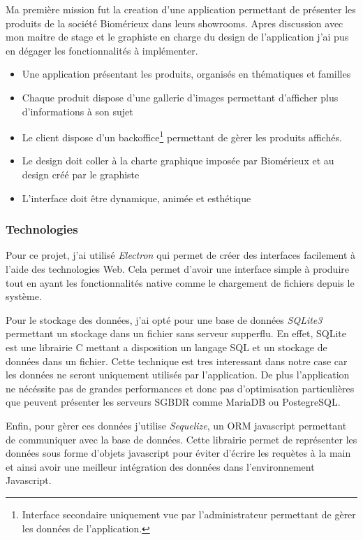 \documentclass{article}
\begin{document}
Ma première mission fut la creation d'une application permettant de présenter les produits de la société Biomérieux dans leurs showrooms.
Apres discussion avec mon maitre de stage et le graphiste en charge du design de l'application j'ai pus en dégager les fonctionnalités à implémenter.

\medskip

\begin{itemize}
    \item Une application présentant les produits, organisés en thématiques et familles
    \item Chaque produit dispose d'une gallerie d'images permettant d'afficher plus d'informations à son sujet
    \item Le client dispose d'un backoffice\footnote{Interface secondaire uniquement vue par l'administrateur permettant de gèrer les données de l'application.} permettant de gèrer les produits affichés.
    \item Le design doit coller à la charte graphique imposée par Biomérieux et au design créé par le graphiste
    \item L'interface doit être dynamique, animée et esthétique
\end{itemize}

\subsubsection{Technologies}

Pour ce projet, j'ai utilisé \emph{Electron} qui permet de créer des interfaces facilement à l'aide des technologies Web.
Cela permet d'avoir une interface simple à produire tout en ayant les fonctionnalités native comme le chargement de fichiers depuis le système.

Pour le stockage des données, j'ai opté pour une base de données \emph{SQLite3} permettant un stockage dans un fichier sans serveur supperflu.
En effet, SQLite est une librairie C mettant a disposition un langage SQL et un stockage de données dans un fichier.
Cette technique est tres interessant dans notre case car les données ne seront uniquement utilisés par l'application.
De plus l'application ne nécéssite pas de grandes performances et donc pas d'optimisation particulières que peuvent présenter les serveurs SGBDR comme MariaDB ou PostegreSQL.

Enfin, pour gèrer ces données j'utilise \emph{Sequelize}, un ORM javascript permettant de communiquer avec la base de données.
Cette librairie permet de représenter les données sous forme d'objets javascript pour éviter d'écrire les requètes à la main et ainsi avoir une meilleur intégration des données dans l'environnement Javascript.
\end{document}
